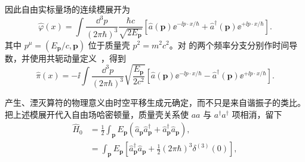 因此自由实标量场的连续模展开为
\begin{equation}
 \boxed{
 \hat\varphi(x)=
 \int\frac{\dd^3 p}{(2\pi\hbar)^3}
 \frac{\hbar c}{\sqrt{2E_{\mathbf p}}}
 \left[
 \hat a(\mathbf p)\ee^{-\ii p\cdot x/\hbar}
 +\hat a^\dagger(\mathbf p)\ee^{+\ii p\cdot x/\hbar}
 \right].}
 \label{eq:scalar-mode-r2}
\end{equation}
其中 $p^\mu=(E_{\mathbf p}/c,\mathbf p)$ 位于质量壳 $p^2=m^2c^2$。对 的两个频率分支分别作时间导数，并使用共轭动量定义~，得到
\begin{equation*}
 \hat\pi(x)=
 -\ii\int\frac{\dd^3 p}{(2\pi\hbar)^3}
 \sqrt{\frac{E_{\mathbf p}}{2c^2}}
 \left[
 \hat a(\mathbf p)\ee^{-\ii p\cdot x/\hbar}
 -\hat a^\dagger(\mathbf p)\ee^{+\ii p\cdot x/\hbar}
 \right].
\end{equation*}

产生、湮灭算符的物理意义由时空平移生成元确定，而不只是来自谐振子的类比。把上述模展开代入自由场哈密顿量，质量壳关系使 $aa$ 与 $a^\dagger a^\dagger$ 项相消，留下
\begin{align}
 \hat H_0
 &=\frac12\int_{\mathbf p}E_{\mathbf p}
 \left(
 \hat a_{\mathbf p}\hat a_{\mathbf p}^\dagger
 +\hat a_{\mathbf p}^\dagger\hat a_{\mathbf p}
 \right),\\
 &=\int_{\mathbf p}E_{\mathbf p}
 \left[
 \hat a_{\mathbf p}^\dagger\hat a_{\mathbf p}
 +\frac12(2\pi\hbar)^3\delta^{(3)}(0)
 \right],
 \label{eq:scalar-H-vac-r2}
\end{align}

